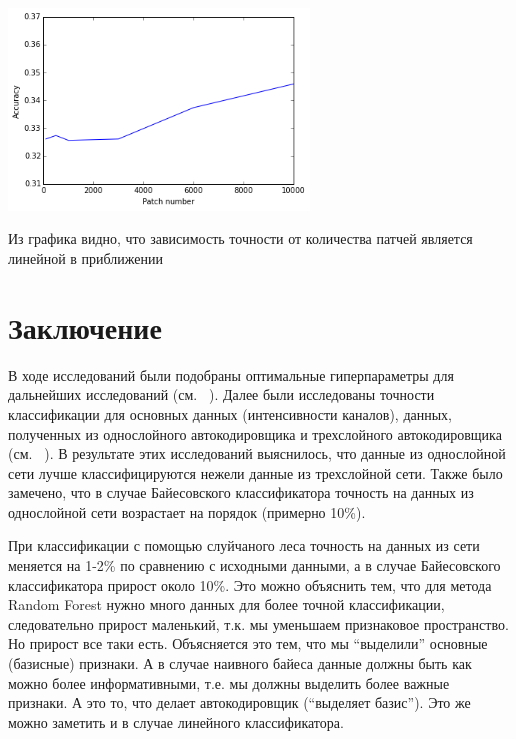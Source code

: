\documentclass[12pt, a4paper]{article}
\begin{document}
			\begin{center}
				\includegraphics[width=8cm]{accuracyFromPatchSize.png}
			\end{center}

			Из графика видно, что зависимость точности от количества патчей является линейной в приближении

	\newpage
	\section{Заключение}
		В ходе исследований были подобраны оптимальные гиперпараметры для дальнейших исследований (см. \textit{~}). Далее были исследованы точности классификации для основных данных (интенсивности каналов), данных, полученных из однослойного автокодировщика и трехслойного автокодировщика (см. \textit{~}). В результате этих исследований выяснилось, что данные из однослойной сети лучше классифицируются нежели данные из трехслойной сети. Также было замечено, что в случае Байесовского классификатора точность на данных из однослойной сети возрастает на порядок (примерно 10\%).

		При классификации с помощью слуйчаного леса точность на данных из сети меняется на 1-2\% по сравнению с исходными данными, а в случае Байесовского классификатора прирост около 10\%. Это можно объяснить тем, что для метода Random Forest нужно много данных для более точной классификации, следовательно прирост маленький, т.к. мы уменьшаем признаковое пространство. Но прирост все таки есть. Объясняется это тем, что мы ``выделили'' основные (базисные) признаки. А в случае наивного байеса данные должны быть как можно более информативными, т.е. мы должны выделить более важные признаки. А это то, что делает автокодировщик (``выделяет базис''). Это же можно заметить и в случае линейного классификатора.
\end{document}
